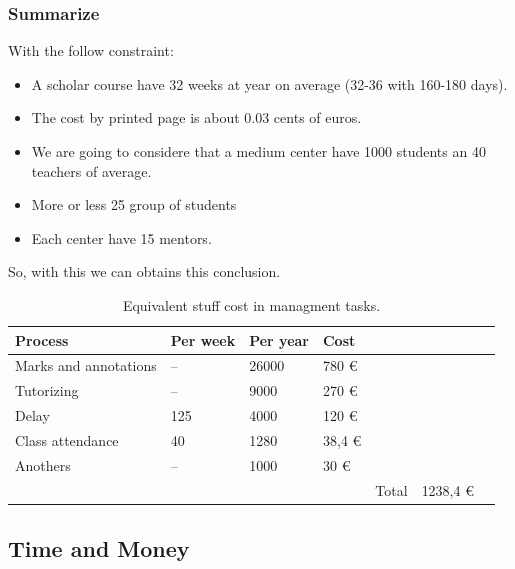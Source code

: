 \subsubsection{Summarize}

With the follow constraint:

\begin{itemize}
\item A scholar course have 32 weeks at year on average (32-36 with 160-180 days).
\item The cost by printed page is about 0.03 cents of euros.
\item We are going to considere that a medium center have 1000 students an 40 teachers of average.
\item More or less 25 group of students
\item Each center have 15 mentors.
\end{itemize}


So, with this we can obtains this conclusion.

\begin{table}[H]
\centering

\begin{tabular}{@{}lllllll@{}}

Process & Per week  & Per year  & Cost  \\
\midrule

Marks and annotations  &  --  &  26000  &   780      \euro  \\
Tutorizing             &  --  &  9000   &   270      \euro  \\
Delay                  &  125 &  4000   &   120      \euro  \\
Class attendance       &  40  &  1280   &   38,4     \euro  \\
Anothers               &  --  &  1000   &   30       \euro  \\


\midrule
& & & & Total & 1238,4 \euro \\
\end{tabular}
\caption{Equivalent stuff cost in managment tasks. }
\label{my-label}
\end{table}




\subsection{Time and Money}

